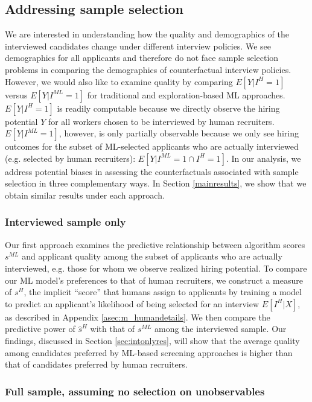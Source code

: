 \documentclass[crop,noquery,editorname,historyrev,nosurname,runningno,sepcount]{RESTUD}
\begin{document}
\subsection{Addressing sample selection}


We are interested in understanding how the quality and demographics of the interviewed candidates change under different interview policies. We see demographics for all applicants and therefore do not face sample selection problems in comparing the demographics of counterfactual interview policies. However, we would also like to examine quality by comparing $E[Y|I^H=1]$ versus $E[Y|I^{ML}=1]$ for traditional and exploration-based ML approaches.  $E[Y|I^H=1]$ is readily computable because we directly observe the hiring potential $Y$ for all workers chosen to be interviewed by human recruiters.  $E[Y|I^{ML}=1]$, however, is only partially observable because we only see hiring outcomes for the subset of ML-selected applicants who are actually interviewed (e.g. selected by human recruiters): $E[Y|I^{ML}=1 \cap I^H=1]$.  In our analysis, we address potential biases in assessing the counterfactuals associated with sample selection in three complementary ways. In Section \ref{mainresults}, we show that we obtain similar results under each approach.  

\subsubsection{Interviewed sample only} \label{sec:intonly}

Our first approach examines the predictive relationship between algorithm scores $s^{ML}$ and applicant quality among the subset of applicants who are actually interviewed, e.g. those for whom we observe realized hiring potential.  
To compare our ML model's preferences to that of human recruiters, we construct a measure of $s^H$, the implicit ``score'' that humans assign to applicants by training a model to predict an applicant's likelihood of being selected for an interview $E[I^H|X]$, as described in Appendix \ref{asec:m_humandetails}.  We then compare the predictive power of $\hat{s}^H$ with that of $s^{ML}$ among the interviewed sample. Our findings, discussed in Section \ref{sec:intonlyres}, will show that the average quality among candidates preferred by ML-based screening approaches is higher than that of candidates preferred by human recruiters. 

\subsubsection{Full sample, assuming no selection on unobservables} \label{sec:ipw}
\end{document}
